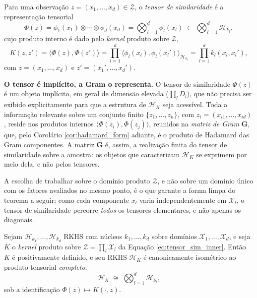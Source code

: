 \begin{definition}\label{def:tensor_sim}
Para uma observação $z = (x_1, \dots, x_d) \in \mathcal{Z}$, o \emph{tensor de similaridade} é a representação tensorial
\begin{equation}\label{eq:tensor_sim_def}
    \Phi(z) = \phi_1(x_1) \otimes \cdots \otimes \phi_d(x_d) = \bigotimes_{l=1}^{d} \phi_l(x_l) \; \in \; \bigotimes_{l=1}^{d} \mathcal{H}_{k_l},
\end{equation}
cujo produto interno é dado pelo \textit{kernel} produto sobre $\mathcal{Z}$,
\begin{equation}\label{eq:tensor_sim_inner}
    K(z, z') = \langle \Phi(z), \Phi(z') \rangle = \prod_{l=1}^{d} \langle \phi_l(x_l), \phi_l(x_l') \rangle_{\mathcal{H}_{k_l}} = \prod_{l=1}^{d} k_l(x_l, x_l'),
\end{equation}
\noindent com $z = (x_1,\dots,x_d)$ e $z' = (x_1',\dots,x_d')$.

\end{definition}
 
\textbf{O tensor é implícito, a Gram o representa.} O tensor de similaridade $\Phi(z)$ é um objeto implícito, em geral de dimensão elevada ($\prod_l D_l$), que não precisa ser exibido explicitamente para que a estrutura de $\mathcal{H}_K$ seja acessível. Toda a informação relevante sobre um conjunto finito $\{z_1, \dots, z_n\}$, com $z_i = (x_{i1}, \dots, x_{id})$, reside nos produtos internos $\langle \Phi(z_i), \Phi(z_j)\rangle$, reunidos na \emph{matriz de Gram} $\mathbf{G}$, que, pelo Corolário \ref{cor:hadamard_form} adiante, é o produto de Hadamard das Gram componentes. A matriz $\mathbf{G}$ é, assim, a realização finita do tensor de similaridade sobre a amostra: os objetos que caracterizam $\mathcal{H}_K$ se exprimem por meio dela, e não pelos tensores.

A escolha de trabalhar sobre o domínio produto $\mathcal{Z}$, e não sobre um domínio único com os fatores avaliados no mesmo ponto, é o que garante a forma limpa do teorema a seguir: como cada componente $x_l$ varia independentemente em $\mathcal{X}_l$, o tensor de similaridade percorre \emph{todos} os tensores elementares, e não apenas os diagonais.

 
\begin{theorem}\label{thm:tensor_similarity}
Sejam $\mathcal{H}_{k_1}, \dots, \mathcal{H}_{k_d}$ RKHS com núcleos $k_1, \dots, k_d$ sobre domínios $\mathcal{X}_1, \dots, \mathcal{X}_d$, e seja $K$ o \textit{kernel} produto sobre $\mathcal{Z} = \prod_l \mathcal{X}_l$ da Equação \eqref{eq:tensor_sim_inner}.
Então $K$ é positivamente definido, e seu RKHS $\mathcal{H}_K$ é canonicamente isométrico ao produto tensorial \emph{completo},
\begin{equation}\label{eq:full_iso}
    \mathcal{H}_K \;\cong\; \bigotimes_{l=1}^{d} \mathcal{H}_{k_l},
\end{equation}
sob a identificação $\Phi(z) \mapsto K(\cdot, z)$.
\end{theorem}
 
